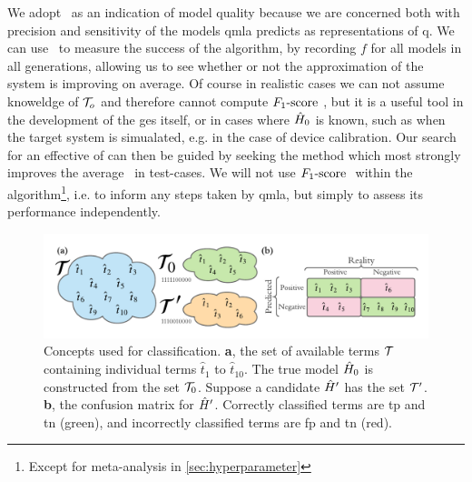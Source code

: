 We adopt \fs \ as an indication of model quality because we are concerned both with precision and sensitivity
    of the models \gls{qmla} predicts as representations of \gls{q}. 
We can use \fs \ to measure the success of the algorithm,
    by recording $f$ for all models in all generations, allowing us to 
    see whether or not the approximation of the system is improving on average. 
Of course in realistic cases we can not assume knoweldge of $\mathcal{T}_o$ and therefore cannot compute 
    $ F_{1}\text{-score}  \ $, but it is a useful tool in the development of the \gls{ges} itself, 
    or in cases where $\hat{H}_0$ is known, such as when the target system is simualated, e.g. in the case of device calibration.
Our search for an effective \gls{of} can then be guided by seeking the 
    method which most strongly improves the average \fs \ in test-cases.
We will not use $ F_{1}\text{-score}  \ $ within the algorithm\footnote{Except for meta-analysis in \cref{sec:hyperparameter}}, 
    i.e. to inform any steps taken by \gls{qmla}, but simply to assess its performance independently.

\begin{figure}
    \begin{center}
        \includegraphics[width=\textwidth]{theoretical_study/figures/classication_example.pdf}
    \end{center}
    \caption[Classification concepts]{
        Concepts used for classification. 
        \textbf{a}, the set of available terms $\mathcal{T}$ containing individual terms $\hat{t}_1$ to $\hat{t}_{10}$. 
        The \gls{true model} $\hat{H}_0$ is constructed from the set $\mathcal{T}_0$. 
        Suppose a candidate $\hat{H}^{\prime}$ has the set $\mathcal{T}^{\prime}$. 
        \textbf{b}, the confusion matrix for $\hat{H}^{\prime}$. Correctly classified terms are \acrlong{tp} and \acrlong{tn} (green), 
            and incorrectly classified terms are \acrlong{fp} and \acrlong{tn} (red). 
    }
    \label{fig:classification_eg}
\end{figure}



